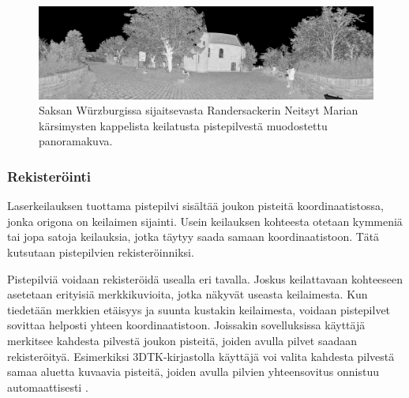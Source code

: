 \begin{figure}
    \centering
    \includegraphics[width=\textwidth]{img/pano.png}
    \caption{Saksan Würzburgissa sijaitsevasta Randersackerin Neitsyt Marian kärsimysten kappelista keilatusta pistepilvestä muodostettu panoramakuva.}
    \label{img:pano}
\end{figure}

\subsubsection{Rekisteröinti}

Laserkeilauksen tuottama pistepilvi sisältää joukon pisteitä koordinaatistossa, jonka origona on keilaimen sijainti. Usein keilauksen kohteesta otetaan kymmeniä tai jopa satoja keilauksia, jotka täytyy saada samaan koordinaatistoon. Tätä kutsutaan pistepilvien rekisteröinniksi. 

Pistepilviä voidaan rekisteröidä usealla eri tavalla. Joskus keilattavaan kohteeseen asetetaan erityisiä merkkikuvioita, jotka näkyvät useasta keilaimesta. Kun tiedetään merkkien etäisyys ja suunta kustakin keilaimesta, voidaan pistepilvet sovittaa helposti yhteen koordinaatistoon. Joissakin sovelluksissa käyttäjä merkitsee kahdesta pilvestä joukon pisteitä, joiden avulla pilvet saadaan rekisteröityä. Esimerkiksi 3DTK-kirjastolla käyttäjä voi valita kahdesta pilvestä samaa aluetta kuvaavia pisteitä, joiden avulla pilvien yhteensovitus onnistuu automaattisesti \cite{3dtk}.  

